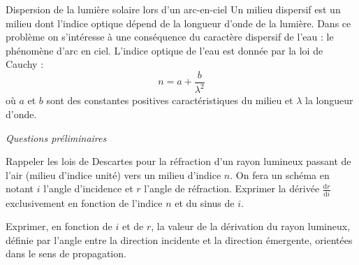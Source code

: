 \begin{exo}[PCSI]{Dispersion de la lumière solaire lors d'un arc-en-ciel}
Un milieu dispersif est un milieu dont l'indice optique dépend de la longueur d'onde de la lumière. Dans ce problème on s'intéresse à une conséquence du caractère dispersif de l'eau : le phénomène d'arc en ciel. L'indice optique de l'eau est donnée par la loi de Cauchy :
\begin{equation*}
n = a + \frac{b}{\lambda^2}
\end{equation*}
où $a$ et $b$ sont des constantes positives caractéristiques du milieu et $\lambda$ la longueur d'onde.
\begin{quest}
\item \textit{Questions préliminaires}
\begin{quest}
\item Rappeler les lois de Descartes pour la réfraction d'un rayon lumineux passant de l'air (milieu d'indice unité) vers un milieu d'indice $n$. On fera un schéma en notant $i$ l'angle d'incidence et $r$ l'angle de réfraction. Exprimer la dérivée $\frac{\mathrm{d}r}{\mathrm{d}i}$ exclusivement en fonction de l'indice $n$ et du sinus de $i$.

\item Exprimer, en fonction de $i$ et de $r$, la valeur de la dérivation du rayon lumineux, définie par l'angle entre la direction incidente et la direction émergente, orientées dans le sens de propagation.


\end{quest}
\end{quest}
\end{exo}
